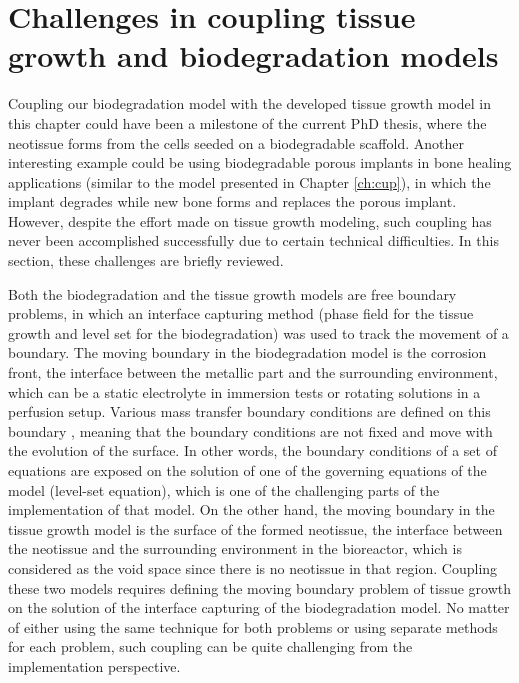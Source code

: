 \section{Challenges in coupling tissue growth and biodegradation models}

Coupling our biodegradation model \cite{Barzegari2021} with the developed tissue growth model in this chapter could have been a milestone of the current PhD thesis, where the neotissue forms from the cells seeded on a biodegradable scaffold. Another interesting example could be using biodegradable porous implants in bone healing applications (similar to the model presented in Chapter \ref{ch:cup}), in which the implant degrades while new bone forms and replaces the porous implant. However, despite the effort made on tissue growth modeling, such coupling has never been accomplished successfully due to certain technical difficulties. In this section, these challenges are briefly reviewed. 

Both the biodegradation and the tissue growth models are free boundary problems, in which an interface capturing method (phase field for the tissue growth and level set for the biodegradation) was used to track the movement of a boundary. The moving boundary in the biodegradation model is the corrosion front, the interface between the metallic part and the surrounding environment, which can be a static electrolyte in immersion tests or rotating solutions in a perfusion setup. Various mass transfer boundary conditions are defined on this boundary \cite{Barzegari2021}, meaning that the boundary conditions are not fixed and move with the evolution of the surface. In other words, the boundary conditions of a set of equations are exposed on the solution of one of the governing equations of the model (level-set equation), which is one of the challenging parts of the implementation of that model. On the other hand, the moving boundary in the tissue growth model is the surface of the formed neotissue, the interface between the neotissue and the surrounding environment in the bioreactor, which is considered as the void space since there is no neotissue in that region. Coupling these two models requires defining the moving boundary problem of tissue growth on the solution of the interface capturing of the biodegradation model. No matter of either using the same technique for both problems or using separate methods for each problem, such coupling can be quite challenging from the implementation perspective.

